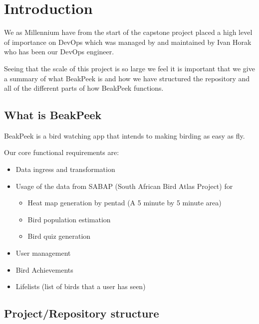 \documentclass[a4paper]{article}
\begin{document}
\newpage

\tableofcontents

\newpage

\section{Introduction}

We as Millennium have from the start of the capstone project placed a high 
level of importance on DevOps which was managed by and maintained by Ivan Horak
who has been our DevOps engineer.\newline

Seeing that the scale of this project is so large we feel it is important that we 
give a summary of what BeakPeek is and how we have structured the repository and 
all of the different parts of how BeakPeek functions.

\subsection{What is BeakPeek}
BeakPeek is a bird watching app that intends to making birding as easy as fly.\newline

Our core functional requirements are:
\begin{itemize}
    \item Data ingress and transformation
    \item Usage of the data from SABAP (South African Bird Atlas Project) for
        \begin{itemize}
            \item Heat map generation by pentad (A 5 minute by 5 minute area)
            \item Bird population estimation
            \item Bird quiz generation
        \end{itemize}
    \item User management
    \item Bird Achievements
    \item Lifelists (list of birds that a user has seen)
\end{itemize}

\subsection{Project/Repository structure}
\end{document}
